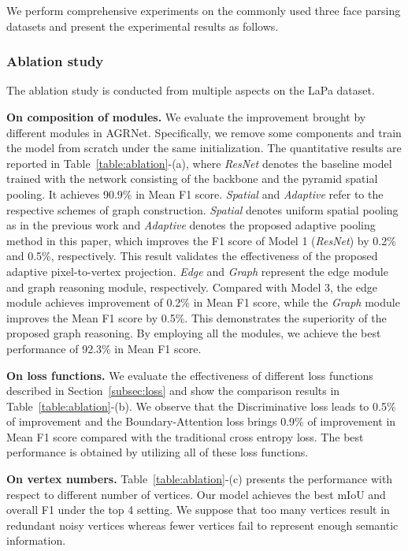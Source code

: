 We perform comprehensive experiments on the commonly used three face parsing datasets and present the experimental results as follows.


\subsubsection{Ablation study}

The ablation study is conducted from multiple aspects on the LaPa dataset.

\textbf{On composition of modules.} 
We evaluate the improvement brought by different modules in AGRNet. 
Specifically, we remove some components and train the model from scratch under the same initialization. The quantitative results are reported in Table~\ref{table:ablation}-(a), where {\it ResNet} denotes the baseline model trained with the network consisting of the backbone and the pyramid spatial pooling. It achieves 90.9\% in Mean F1 score.
{\it Spatial} and {\it Adaptive} refer to the respective schemes of graph construction. 
{\it Spatial} denotes uniform spatial pooling as in the previous work \cite{te2020edge} and {\it Adaptive} denotes the proposed adaptive pooling method in this paper, which improves the F1 score of Model 1 ({\it ResNet}) by 0.2\% and 0.5\%, respectively.
This result validates the effectiveness of the proposed adaptive pixel-to-vertex projection. 
{\it Edge} and {\it Graph} represent the edge module and graph reasoning module, respectively. 
Compared with Model 3, the edge module achieves improvement of 0.2\% in Mean F1 score, while the {\it Graph} module improves the Mean F1 score by 0.5\%. 
This demonstrates the superiority of the proposed graph reasoning. 
By employing all the modules, we achieve the best performance of 92.3\% in Mean F1 score.

\textbf{On loss functions.} We evaluate the effectiveness of different loss functions described in Section~\ref{subsec:loss} and show the comparison results in Table~\ref{table:ablation}-(b). We observe that the Discriminative loss leads to 0.5\% of improvement and the Boundary-Attention loss brings 0.9\% of improvement in Mean F1 score compared with the traditional cross entropy loss. The best performance is obtained by utilizing all of these loss functions.

\textbf{On vertex numbers.} Table~\ref{table:ablation}-(c) presents the performance with respect to different number of vertices. Our model achieves the best mIoU and overall F1 under the top 4 setting. We suppose that too many vertices result in redundant noisy vertices whereas fewer vertices fail to represent enough semantic information.

